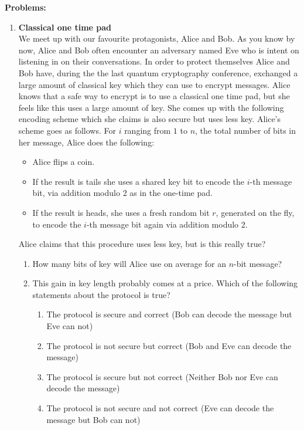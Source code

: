 \documentclass[12pt]{article}
\begin{document}
 
\medskip
{\bf Problems:}
\begin{enumerate}
\item {\bf Classical one time pad}\\
We meet up with our favourite protagonists, Alice and Bob. As you know by now, Alice and Bob often encounter an adversary named Eve who is intent on listening in on their conversations. In order to protect themselves Alice and Bob have, during the the last quantum cryptography conference, exchanged a large amount of classical key which they can use to encrypt messages. Alice knows that a safe way to encrypt is to use a classical one time pad, but she feels like this uses a large amount of key. She comes up with the following encoding scheme which she claims is also secure but uses less key. Alice's scheme goes as follows. For $i$ ranging from $1$ to $n$, the total number of bits in her message, Alice does the following: 
\begin{itemize}
\item Alice flips a coin.
\item If the result is tails she uses a shared key bit to encode the $i$-th message bit, via addition modulo 2 as in the one-time pad.
\item If the result is heads,  she uses a fresh random bit $r$, generated on the fly, to encode the $i$-th message bit again via addition modulo 2. 
\end{itemize}
Alice claims that this procedure uses less key, but is this really true?
\begin{enumerate}
\item  How many bits of key will Alice use on average for an $n$-bit message? 
\item This gain in key length probably comes at a price. Which of the following statements about the protocol is true?
\begin{enumerate}
\item The protocol is secure and correct (Bob can decode the message but Eve can not)
\item The protocol is not secure but correct (Bob and Eve can decode the message)
\item The protocol is secure but not correct (Neither Bob nor Eve can decode the message)
\item The protocol is not secure and not correct (Eve can decode the message but Bob can not)
\end{enumerate}
\end{enumerate}


\end{enumerate}
\end{document}
